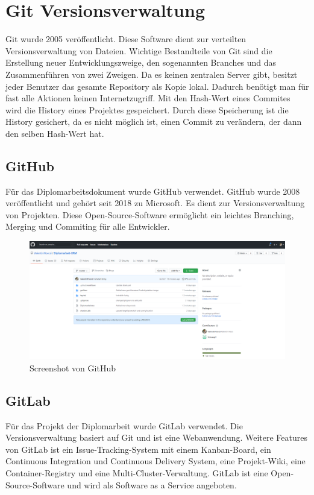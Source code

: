 \section{Git Versionsverwaltung}
Git wurde 2005 veröffentlicht. Diese Software dient zur verteilten Versionsverwaltung von Dateien. Wichtige Bestandteile von Git sind die Erstellung neuer Entwicklungszweige, den sogenannten Branches und das Zusammenführen von zwei Zweigen. Da es keinen zentralen Server gibt, besitzt jeder Benutzer das gesamte Repository als Kopie lokal. Dadurch benötigt man für fast alle Aktionen keinen Internetzugriff. Mit den Hash-Wert eines Commites wird die History eines Projektes gespeichert. Durch diese Speicherung ist die History gesichert, da es nicht möglich ist, einen Commit zu verändern, der dann den selben Hash-Wert hat. \autocite{wikiGit}

\subsection{GitHub}
Für das Diplomarbeitsdokument wurde GitHub verwendet. GitHub wurde 2008 veröffentlicht und gehört seit 2018 zu Microsoft. Es dient zur Versionsverwaltung von Projekten. Diese Open-Source-Software ermöglicht ein leichtes Branching, Merging und Commiting für alle Entwickler. \autocite{wikiGitHub}

\begin{figure}[H]
	\centerline{
		\includegraphics[width=1\textwidth, frame]{./grafiken/github_screen.png}
	}
	\vskip0pt
	\caption{Screenshot von GitHub} \label{fig:github}
\end{figure}

\subsection{GitLab}
Für das Projekt der Diplomarbeit wurde GitLab verwendet. Die Versionsverwaltung basiert auf Git und ist eine Webanwendung. Weitere Features von GitLab ist ein Issue-Tracking-System mit einem Kanban-Board, ein Continuous Integration und Continuous Delivery System, eine Projekt-Wiki, eine Container-Registry und eine Multi-Cluster-Verwaltung. GitLab ist eine Open-Source-Software und wird als Software as a Service angeboten. \autocite{wikiGitLab}

